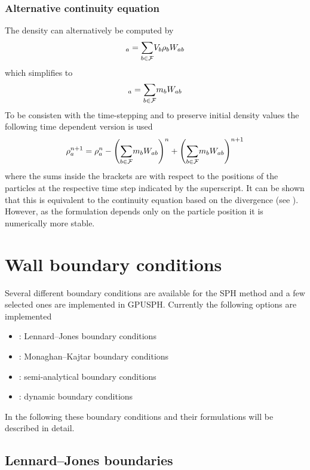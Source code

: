 \documentclass{../GPUSPHtemplate}
\begin{document}
\subsubsection{Alternative continuity equation}
The density can alternatively be computed by
\begin{equation}
[\rho]_a = \sumF V_b \rho_b W_{ab}
\end{equation}
which simplifies to
\begin{equation}
[\rho]_a = \sumF m_b W_{ab}
\label{e:sph:sumrho}
\end{equation}
To be consisten with the time-stepping and to preserve initial density
values the following time dependent version is used
\begin{equation}
\rho_a^{n+1} = \rho_a^n - \left(\underset{b \in \mathcal{F}}{\sum} m_b W_{ab}\right)^n + \left(\underset{b \in \mathcal{F}}{\sum}
m_b W_{ab}\right)^{n+1}
\label{e:sph:sumrho-time}
\end{equation}
where the sums inside the brackets are with respect to the positions of
the particles at the respective time step indicated by the superscript.
It can be shown that this is equivalent to the
continuity equation based on the divergence (see \cite{Vila1999}).
However, as the formulation depends only on the particle
position it is numerically more stable.

\section{Wall boundary conditions}\label{sec:boundary_conditions}

Several different boundary conditions are available for the SPH method
and a few selected ones are implemented in GPUSPH. Currently the
following options are implemented
\begin{itemize}
  \item {}: Lennard--Jones boundary conditions
  \item {}: Monaghan--Kajtar boundary conditions
  \item {}: semi-analytical boundary conditions
  \item {}: dynamic boundary conditions
\end{itemize}
In the following these boundary conditions and their formulations will
be described in detail.

\subsection{Lennard--Jones boundaries}
\end{document}
